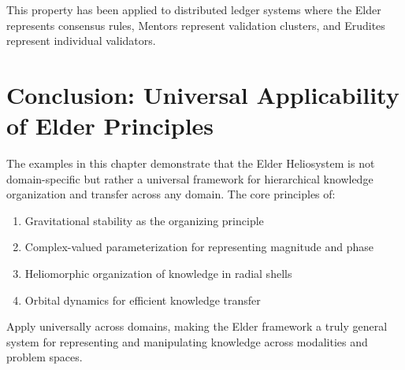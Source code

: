 This property has been applied to distributed ledger systems where the Elder represents consensus rules, Mentors represent validation clusters, and Erudites represent individual validators.

\section{Conclusion: Universal Applicability of Elder Principles}

The examples in this chapter demonstrate that the Elder Heliosystem is not domain-specific but rather a universal framework for hierarchical knowledge organization and transfer across any domain. The core principles of:

\begin{enumerate}
    \item Gravitational stability as the organizing principle
    \item Complex-valued parameterization for representing magnitude and phase
    \item Heliomorphic organization of knowledge in radial shells
    \item Orbital dynamics for efficient knowledge transfer
\end{enumerate}

Apply universally across domains, making the Elder framework a truly general system for representing and manipulating knowledge across modalities and problem spaces.